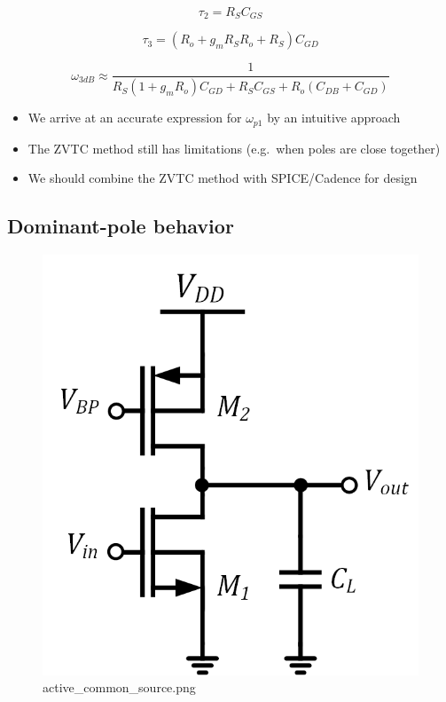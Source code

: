 \documentclass[11pt]{article}
\providecommand{\tightlist}{%
      \setlength{\itemsep}{0pt}\setlength{\parskip}{0pt}}
\begin{document}
\begin{equation}
\tau_2 = R_S C_{GS}
\end{equation}

\begin{equation}
\tau_3 = (R_o + g_m R_S R_o + R_S) C_{GD}
\end{equation}

    \begin{equation}
\omega_{3dB} \approx \dfrac{1}{R_S(1+g_m R_o)C_{GD} + R_SC_{GS}+R_o(C_{DB}+C_{GD})}
\end{equation}

    \begin{itemize}
\tightlist
\item
  We arrive at an accurate expression for \(\omega_{p1}\) by an
  intuitive approach
\item
  The ZVTC method still has limitations (e.g.~when poles are close
  together)
\item
  We should combine the ZVTC method with SPICE/Cadence for design
\end{itemize}

    \hypertarget{dominant-pole-behavior}{%
\subsection{Dominant-pole behavior}\label{dominant-pole-behavior}}

    \begin{figure}
\centering
\includegraphics{active_common_source.png}
\caption{active\_common\_source.png}
\end{figure}
\end{document}
